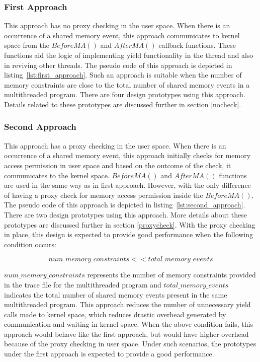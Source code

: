 \subsubsection{First Approach \label{fir_app}}

This approach has no proxy checking in the user space. 
When there is an occurrence of a shared memory event, this approach communicates to kernel space from the $BeforeMA()$ and $AfterMA()$ callback functions. 
These functions aid the logic of implementing yield functionality in the thread and also in reviving other threads. 
The pseudo code of this approach is depicted in listing~\ref{lst:first_approach}. 
Such an approach is suitable when the number of memory constraints are close to the total number of shared memory events in a multithreaded program. 
There are four design prototypes using this approach. 
Details related to these prototypes are discussed further in section \ref{nocheck}.

\subsubsection{Second Approach \label{sec_app}}

This approach has a proxy checking in the user space. 
When there is an occurrence of a shared memory event, this approach initially checks for memory access permission in user space and based on the outcome of the check, it communicates to the kernel space. 
$BeforeMA()$ and $AfterMA()$ functions are used in the same way as in first approach. 
However, with the only difference of having a proxy check for memory access permission inside the $BeforeMA()$. 
The pseudo code of this approach is depicted in listing~\ref{lst:second_approach}.
There are two design prototypes using this approach. More details about these prototypes are discussed further in section \ref{proxycheck}.
With the proxy checking in place, this design is expected to provide good performance when the following condition occurs: 

\begin{equation}
num\_memory\_constraints << total\_memory\_events
\label{mem_cond}
\end{equation}

$num\_memory\_constraints$ represents the number of memory constraints provided in the trace file for the multithreaded program and $total\_memory\_events$ indicates the total number of shared memory events present in the same multithreaded program.
This approach reduces the number of unnecessary yield calls made to kernel space, which reduces drastic overhead generated by communication and waiting in kernel space. 
When the above condition fails, this approach would behave like the first approach, but would have higher overhead because of the proxy checking in user space. 
Under such scenarios, the prototypes under the first approach is expected to provide a good performance. 


